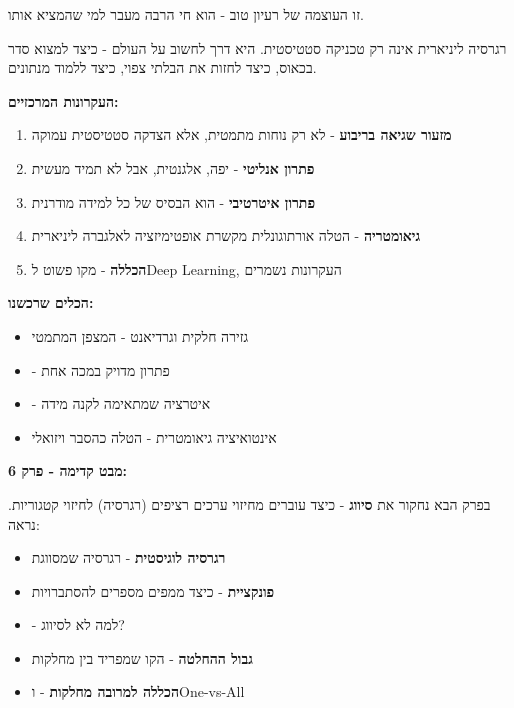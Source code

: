 זו העוצמה של רעיון טוב - הוא חי הרבה מעבר למי שהמציא אותו.


רגרסיה ליניארית אינה רק טכניקה סטטיסטית. היא דרך לחשוב על העולם - כיצד למצוא סדר בכאוס, כיצד לחזות את הבלתי צפוי, כיצד ללמוד מנתונים.

\textbf{העקרונות המרכזיים:}

\begin{enumerate}
\item \textbf{מזעור שגיאה בריבוע} - לא רק נוחות מתמטית, אלא הצדקה סטטיסטית עמוקה
\item \textbf{פתרון אנליטי} -  יפה, אלגנטית, אבל לא תמיד מעשית
\item \textbf{פתרון איטרטיבי} -  הוא הבסיס של כל למידה מודרנית
\item \textbf{גיאומטריה} - הטלה אורתוגונלית מקשרת אופטימיזציה לאלגברה ליניארית
\item \textbf{הכללה} - מקו פשוט ל\en{-}Deep Learning, העקרונות נשמרים
\end{enumerate}

\textbf{הכלים שרכשנו:}

\begin{itemize}
\item גזירה חלקית וגרדיאנט - המצפן המתמטי
\item {} - פתרון מדויק במכה אחת
\item {} - איטרציה שמתאימה לקנה מידה
\item אינטואיציה גיאומטרית - הטלה כהסבר ויזואלי
\end{itemize}

\textbf{מבט קדימה - פרק \num{6}:}

בפרק הבא נחקור את \textbf{סיווג} - כיצד עוברים מחיזוי ערכים רציפים (רגרסיה) לחיזוי קטגוריות. נראה:

\begin{itemize}
\item \textbf{רגרסיה לוגיסטית} - רגרסיה שמסווגת
\item \textbf{פונקציית } - כיצד ממפים מספרים להסתברויות
\item \textbf{} - למה לא  לסיווג?
\item \textbf{גבול ההחלטה} - הקו שמפריד בין מחלקות
\item \textbf{הכללה למרובה מחלקות} -  ו\en{-}One-vs-All
\end{itemize}

